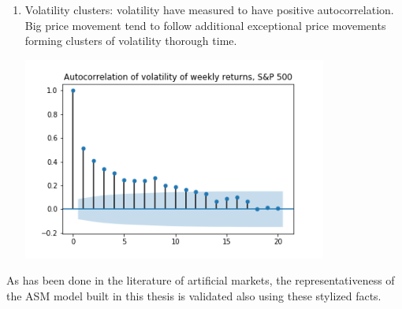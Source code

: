 \begin{enumerate}
\begin{minipage}{\linewidth}
        \label{fig:sp_autocorr}
    \end{minipage}
    \item Volatility clusters: volatility have measured to have positive autocorrelation. Big price movement tend to follow additional exceptional price movements forming clusters of volatility thorough time.
    \par
    \begin{minipage}{\linewidth}
        \centering
        \includegraphics[width=10cm]{plots/S&P500_vola_autocorr.png}
        \label{fig:sp_volaclusters}
    \end{minipage}
\end{enumerate} 


As has been done in the literature of artificial markets, the 
representativeness of the ASM model built in this thesis is validated also 
using these stylized facts.